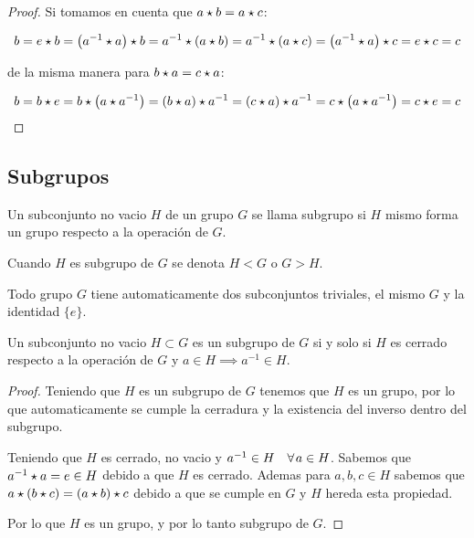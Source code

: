         \begin{proof}
            Si tomamos en cuenta que $a \star b = a \star c$:

            \begin{equation*}
                b = e \star b = \left( a^{-1} \star a \right) \star b = a^{-1} \star \left( a \star b \right) = a^{-1} \star \left( a \star c \right) = \left( a^{-1} \star a \right) \star c = e \star c = c
            \end{equation*}

            de la misma manera para $b \star a = c \star a$:

            \begin{equation*}
                b = b \star e = b \star \left( a \star a^{-1} \right) = \left( b \star a \right) \star a^{-1} = \left( c \star a \right) \star a^{-1} = c \star \left( a \star a^{-1} \right) = c \star e = c
            \end{equation*}
        \end{proof}


    \subsection{Subgrupos}

        \begin{definicion}
            Un subconjunto no vacio $H$ de un grupo $G$ se llama subgrupo si $H$ mismo forma un grupo respecto a la operación de $G$.

            Cuando $H$ es subgrupo de $G$ se denota $H < G$ o $G > H$.
        \end{definicion}

        \begin{observacion}
            Todo grupo $G$ tiene automaticamente dos subconjuntos triviales, el mismo $G$ y la identidad $\{e\}$.
        \end{observacion}

        \begin{proposicion}
            Un subconjunto no vacio $H \subset G$ es un subgrupo de $G$ si y solo si $H$ es cerrado respecto a la operación de $G$ y $a \in H \implies a^{-1} \in H$.
        \end{proposicion}

        \begin{proof}
            Teniendo que $H$ es un subgrupo de $G$ tenemos que $H$ es un grupo, por lo que automaticamente se cumple la cerradura y la existencia del inverso dentro del subgrupo.

            Teniendo que $H$ es cerrado, no vacio y $a^{-1} \in H \quad \forall \mkern2mu a \in H$.
            Sabemos que $a^{-1} \star a  = e \in H$ debido a que $H$ es cerrado.
            Ademas para $a, b, c \in H$ sabemos que $a \star (b \star c) = (a \star b) \star c$ debido a que se cumple en $G$ y $H$ hereda esta propiedad.

            Por lo que $H$ es un grupo, y por lo tanto subgrupo de $G$.
        \end{proof}


